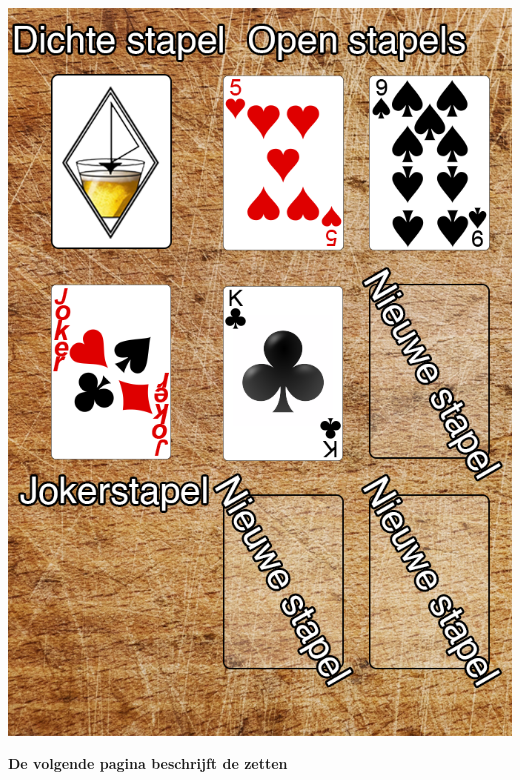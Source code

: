 \begin{minipage}[t]{.48\textwidth}
\includegraphics[width=.96\textwidth]{img/Frits_plank_v4_1.png}
\end{minipage}

\vspace{+0.4cm}

\centerline{\Large{\textbf{De volgende pagina beschrijft de zetten}}}
